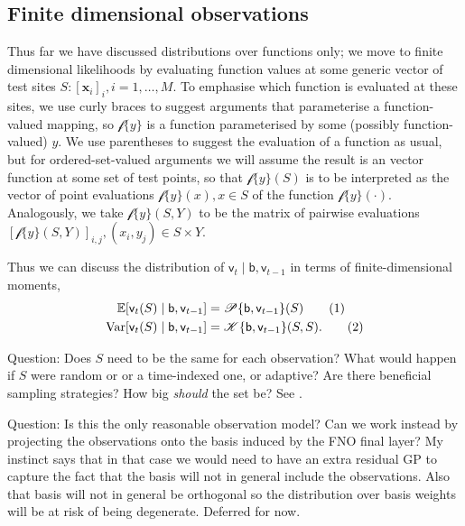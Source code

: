 \documentclass{article}
\newcommand\numberthis{\addtocounter{equation}{1}\tag{\theequation}}
\newcommand{\var}{\operatorname{Var}}
\newcommand{\vv}[1]{\boldsymbol{#1}}
\newcommand{\rv}[1]{\mathsf{#1}}
\newcommand{\set}[1]{#1}
\newcommand{\op}[1]{\mathscr{#1}}
\newcommand{\gvn}{\mid}
\newcommand{\Ex}{\mathbb{E}}
\newcommand{\lat}{\rv{b}}   %
\begin{document}
\subsection{Finite dimensional observations}
Thus far we have discussed distributions over functions only; we move to finite dimensional likelihoods by evaluating function values at some generic vector of test sites \(\set{S}:[\vv{x}_{i}]_{i}, i=1,\dots,M\).
To emphasise which function is evaluated at these sites, we use curly braces to suggest arguments that parameterise a function-valued mapping, so \(\op{f}\{y\}\) is a function parameterised by some (possibly function-valued) \(y\).
We use parentheses to suggest the evaluation of a function as usual, but for ordered-set-valued arguments we will assume the result is an vector function at some set of test points, so that \(\op{f}\{y\}(\set{S})\) is to be interpreted as the vector of point evaluations \(\op{f}\{y\}(x), x\in \set{S}\) of the function \(\op{f}\{y\}(\cdot)\).
Analogously, we take \(\op{f}\{y\}(\set{S},\set{Y})\) to be the matrix of pairwise evaluations \([\op{f}\{y\}(\set{S},\set{Y})]_{i,j}, (x_i,y_j)\in\set{S}\times\set{Y}\).

Thus we can discuss the distribution of \(\rv{v}_{t}\gvn \lat,\rv{v}_{t-1}\) in terms of finite-dimensional moments,
\begin{align*}
\Ex[\rv{v}_{t}(\set{S})\gvn \lat,\rv{v}_{t-1}]
&= \op{P}\{\lat,\rv{v}_{t-1}\}(\set{S})\label{eq:fidi_proc_ex}\numberthis\\
\var[\rv{v}_{t}(\set{S})\gvn \lat,\rv{v}_{t-1}]
&= \op{K}\{\lat,\rv{v}_{t-1}\}(\set{S},\set{S}).\label{eq:fidi_proc_var} \numberthis
\end{align*}

Question: Does \(\set{S}\) need to be the same for each observation?
What would happen if \(\set{S}\) were random or or a time-indexed one, or adaptive?
Are there beneficial sampling strategies?
How big \emph{should} the set be? See \cite{LassasDiscretizationinvariant2009}.

Question: Is this the only reasonable observation model?
Can we work instead by projecting the observations onto the basis induced by the FNO final layer?
My instinct says that in that case we would need to have an extra residual GP to capture the fact that the basis will not in general include the observations.
Also that basis will not in general be orthogonal so the distribution over basis weights will be at risk of being degenerate.
Deferred for now.
\end{document}
